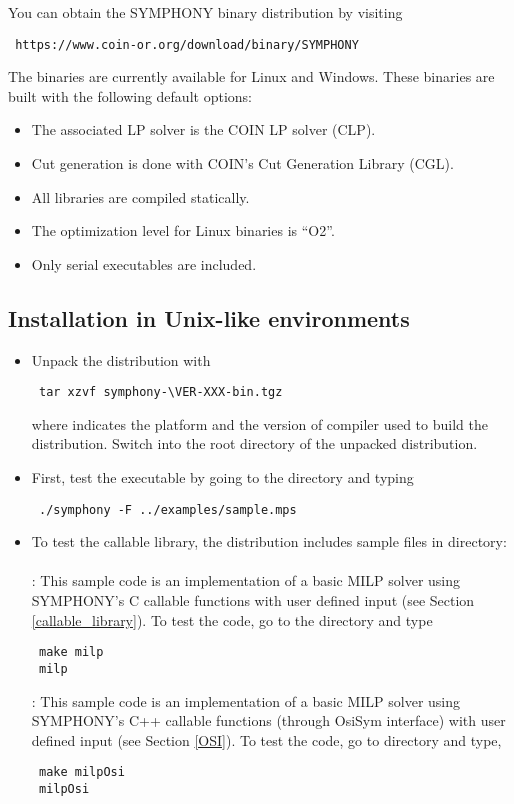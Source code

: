 You can obtain the SYMPHONY binary distribution by visiting 
{\color{Brown}
\begin{verbatim}
 https://www.coin-or.org/download/binary/SYMPHONY
\end{verbatim}
}
The binaries are currently available for Linux and Windows. These binaries are
built with the following default options:
\begin{itemize}
\item The associated LP solver is the COIN LP solver (CLP).
\item Cut generation is done with COIN's Cut Generation Library (CGL).
\item All libraries are compiled statically.
\item The optimization level for Linux binaries is ``O2''. 
\item Only serial executables are included.
\end{itemize} 

\subsection{Installation in Unix-like environments}
\label{building-unix}

\begin{itemize}
\item Unpack the distribution with
{\color{Brown}
\begin{verbatim}
 tar xzvf symphony-\VER-XXX-bin.tgz
\end{verbatim}
}
where  indicates the platform and the version of 
compiler used to build the distribution. 
Switch into the root directory of the unpacked distribution. 

\item First, test the executable by going to the  directory and
typing 
{\color{Brown}
\begin{verbatim}
 ./symphony -F ../examples/sample.mps
\end{verbatim}
}
\item To test the callable library, the distribution
includes sample files in  directory:  \\ \\
: This sample code is an implementation of a basic MILP
solver using SYMPHONY's C callable functions with user defined input (see
Section
\ref{callable_library}). To test the code, go to the  directory 
and type 
{\color{Brown}
\begin{verbatim}
 make milp 
 milp
 \end{verbatim}}
: This sample code is an implementation of a basic MILP 
solver using SYMPHONY's C++ callable functions (through OsiSym interface)
with user defined input (see Section \ref{OSI}). To test the code, 
go to  directory and type, 
{\color{Brown}
\begin{verbatim}
 make milpOsi
 milpOsi
 \end{verbatim}}
\end{itemize}

